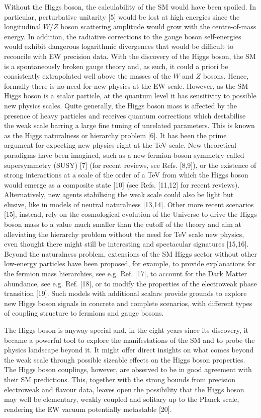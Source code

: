 \documentclass[12pt]{article}
\begin{document}
Without the Higgs boson, the calculability of the SM would have been spoiled. In particular, perturbative unitarity [5] would be lost at high energies since the longitudinal $W/Z$ boson scattering amplitude would grow with the centre-of-mass energy. In addition, the radiative corrections to the gauge boson self-energies would exhibit dangerous logarithmic divergences that would be difficult to reconcile with EW precision data. With the discovery of the Higgs boson, the SM is a spontaneously broken gauge theory and, as such, it could a priori be consistently extrapolated well above the masses of the $W$ and $Z$ bosons. Hence, formally there is no need for new physics at the EW scale. However, as the SM Higgs boson is a scalar particle, at the quantum level it has sensitivity to possible new physics scales. Quite generally, the Higgs boson mass is affected by the presence of heavy particles and receives quantum corrections which destabilise the weak scale barring a large fine tuning of unrelated parameters. This is known as the Higgs naturalness or hierarchy problem [6]. It has been the prime argument for expecting new physics right at the TeV scale. New theoretical paradigms have been imagined, such as a new fermion-boson symmetry called supersymmetry (SUSY) [7] (for recent reviews, see Refs. [8,9]), or the existence of strong interactions at a scale of the order of a TeV from which the Higgs boson would emerge as a composite state [10] (see Refs. [11,12] for recent reviews). Alternatively, new agents stabilising the weak scale could also be light but elusive, like in models of neutral naturalness [13,14]. Other more recent scenarios [15], instead, rely on the cosmological evolution of the Universe to drive the Higgs boson mass to a value much smaller than the cutoff of the theory and aim at alleviating the hierarchy problem without the need for TeV scale new physics, even thought there might still be interesting and spectacular signatures [15,16]. Beyond the naturalness problem, extensions of the SM Higgs sector without other low-energy particles have been proposed, for example, to provide explanations for the fermion mass hierarchies, see e.g. Ref. [17], to account for the Dark Matter abundance, see e.g. Ref. [18], or to modify the properties of the electroweak phase transition [19]. Such models with additional scalars provide grounds to explore new Higgs boson signals in concrete and complete scenarios, with different types of coupling structure to fermions and gauge bosons.

The Higgs boson is anyway special and, in the eight years since its discovery, it became a powerful tool to explore the manifestations of the SM and to probe the physics landscape beyond it. It might offer direct insights on what comes beyond the weak scale through possible sizeable effects on the Higgs boson properties. The Higgs boson couplings, however, are observed to be in good agreement with their SM predictions. This, together with the strong bounds from precision electroweak and flavour data, leaves open the possibility that the Higgs boson may well be elementary, weakly coupled and solitary up to the Planck scale, rendering the EW vacuum potentially metastable [20].
\end{document}
